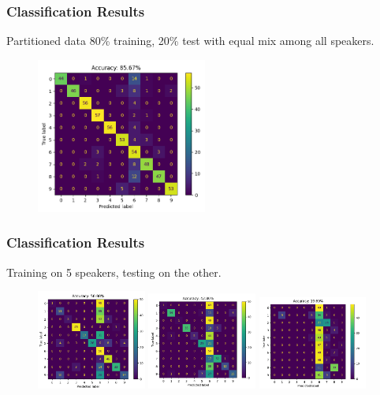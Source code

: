 \documentclass{beamer}
\begin{document}
\begin{frame}
  \frametitle{Classification Results}
  Partitioned data 80\% training, 20\% test with equal mix among all speakers.
  \begin{figure}[h]
    \centering
    \includegraphics[width=0.5\textwidth]{img/run30.png}
  \end{figure}
\end{frame}

\begin{frame}
  \frametitle{Classification Results}
  Training on 5 speakers, testing on the other.
  \begin{figure}[h]
    \centering
    \includegraphics[width=0.32\textwidth]{img/jackson.png}
    \includegraphics[width=0.32\textwidth]{img/theo.png}
    \includegraphics[width=0.32\textwidth]{img/george.png}
  \end{figure}

\end{frame}
\end{document}
